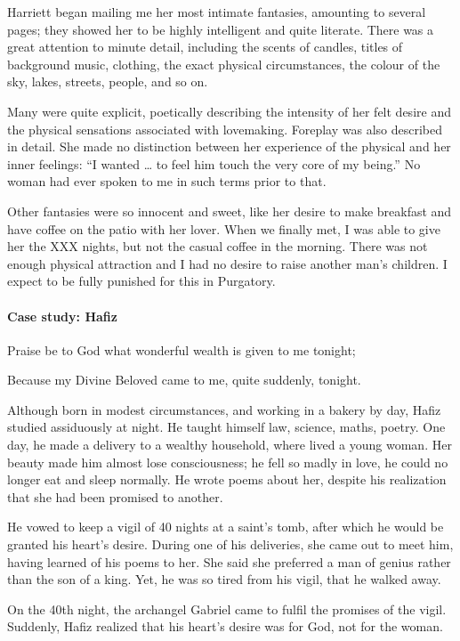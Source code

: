 Harriett began mailing me her most intimate fantasies, amounting to several pages; they showed her to be highly intelligent and quite literate. There was a great attention to minute detail, including the scents of candles, titles of background music, clothing, the exact physical circumstances, the colour of the sky, lakes, streets, people, and so on.

Many were quite explicit, poetically describing the intensity of her felt desire and the physical sensations associated with lovemaking. Foreplay was also described in detail. She made no distinction between her experience of the physical and her inner feelings: “I wanted … to feel him touch the very core of my being.” No woman had ever spoken to me in such terms prior to that.

Other fantasies were so innocent and sweet, like her desire to make breakfast and have coffee on the patio with her lover. When we finally met, I was able to give her the XXX nights, but not the casual coffee in the morning. There was not enough physical attraction and I had no desire to raise another man's children. I expect to be fully punished for this in Purgatory.

\paragraph{Case study: Hafiz}
\begin{quotex}
Praise be to God what wonderful wealth is given to me tonight;

Because my Divine Beloved came to me, quite suddenly, tonight. 

\end{quotex}
Although born in modest circumstances, and working in a bakery by day, Hafiz studied assiduously at night. He taught himself law, science, maths, poetry. One day, he made a delivery to a wealthy household, where lived a young woman. Her beauty made him almost lose consciousness; he fell so madly in love, he could no longer eat and sleep normally. He wrote poems about her, despite his realization that she had been promised to another.

He vowed to keep a vigil of 40 nights at a saint's tomb, after which he would be granted his heart's desire. During one of his deliveries, she came out to meet him, having learned of his poems to her. She said she preferred a man of genius rather than the son of a king. Yet, he was so tired from his vigil, that he walked away.

On the 40th night, the archangel Gabriel came to fulfil the promises of the vigil. Suddenly, Hafiz realized that his heart's desire was for God, not for the woman.

